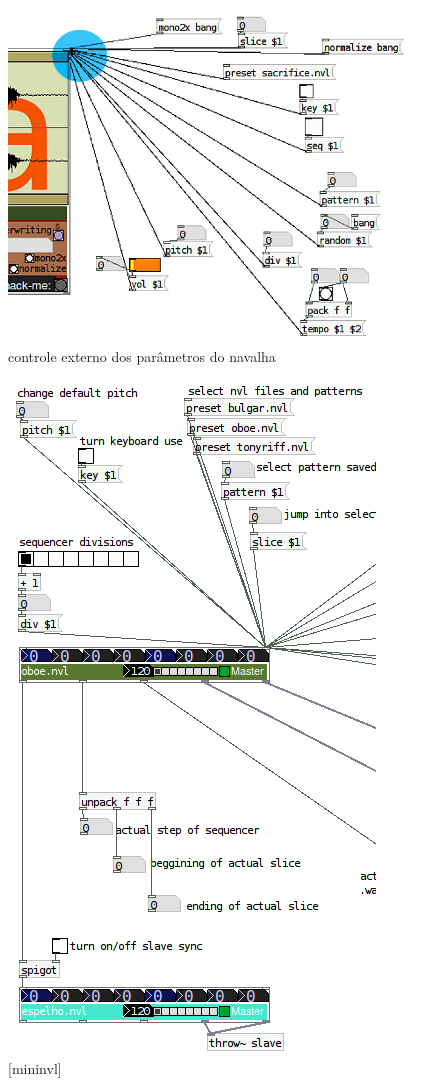 \documentclass[draft]{ppgmus}
\begin{document}
\begin{figure}
\includegraphics[scale=.6]{controls-nvl}
\caption{controle externo dos parâmetros do navalha}
\label{control-nvl}
\end{figure}

\begin{figure}
\includegraphics[scale=.6]{mininvl}
\caption{[mininvl]}
\label{mininvl}
\end{figure}
\end{document}
